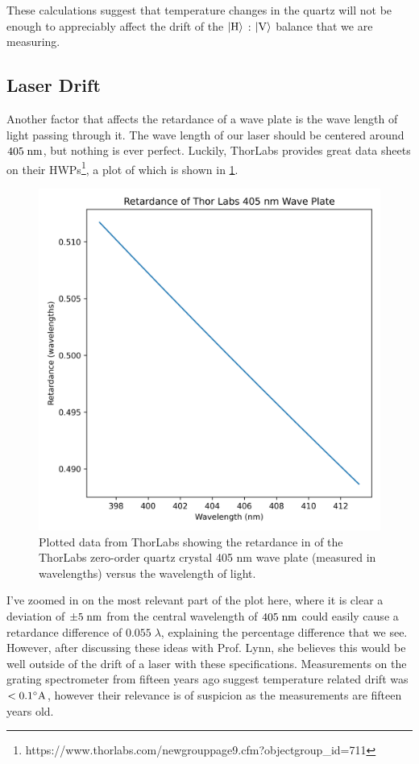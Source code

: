 These calculations suggest that temperature changes in the quartz will not be enough to appreciably affect the drift of the $\ket{\text{H}}$ : $\ket{\text{V}}$ balance that we are measuring.

\subsection{Laser Drift}

Another factor that affects the retardance of a wave plate is the wave length of light passing through it. The wave length of our laser should be centered around $405\;{\text{nm}}$, but nothing is ever perfect. Luckily, ThorLabs provides great data sheets on their HWPs\footnote{https://www.thorlabs.com/newgrouppage9.cfm?objectgroup\_id=711}, a plot of which is shown in \cref{fig:405nm wp wavelen vs retardance}.
\begin{figure}[ht]
	\centering
	\includegraphics[width=\textwidth]{405_WP_retardance.png}
	\caption{Plotted data from ThorLabs showing the retardance in of the ThorLabs zero-order quartz crystal 405 nm wave plate (measured in wavelengths) versus the wavelength of light.}
	\label{fig:405nm wp wavelen vs retardance}
\end{figure}
I've zoomed in on the most relevant part of the plot here, where it is clear a deviation of $\pm5\;{\text{nm}}$ from the central wavelength of $405\;{\text{nm}}$ could easily cause a retardance difference of $0.055\;\lambda$, explaining the percentage difference that we see. However, after discussing these ideas with Prof. Lynn, she believes this would be well outside of the drift of a laser with these specifications. Measurements on the grating spectrometer from fifteen years ago suggest temperature related drift was $<0.1{}^\circ{\text{A}}$, however their relevance is of suspicion as the measurements are fifteen years old.








	